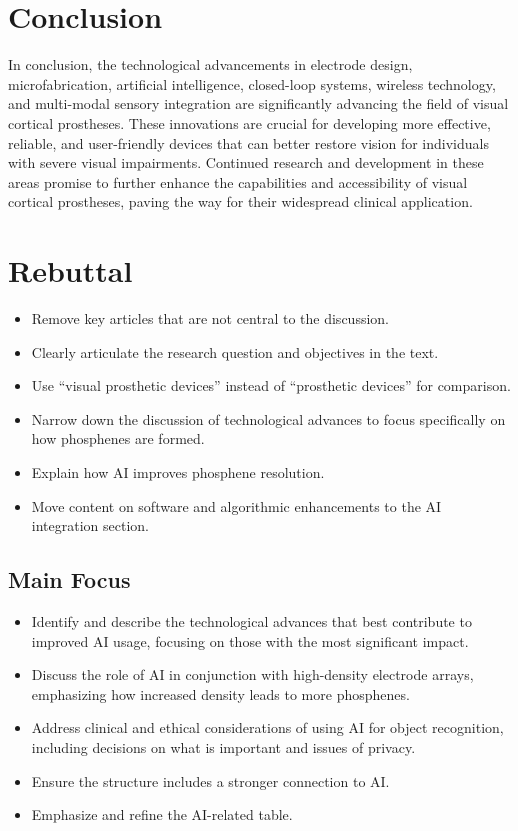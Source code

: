 \documentclass[twocolumn,10pt]{article}
\begin{document}
\section*{Conclusion}\label{sec:conclusion}
In conclusion, the technological advancements in electrode design,
microfabrication, artificial intelligence, closed-loop systems, wireless
technology, and multi-modal sensory integration are significantly advancing the
field of visual cortical prostheses. These innovations are crucial for
developing more effective, reliable, and user-friendly devices that can better
restore vision for individuals with severe visual impairments. Continued
research and development in these areas promise to further enhance the
capabilities and accessibility of visual cortical prostheses, paving the way for
their widespread clinical application.

\printbibliography%
\onecolumn
\newpage
\section*{Rebuttal}\label{sec:rebuttal}
\begin{itemize}
      \item Remove key articles that are not central to the discussion.
      \item Clearly articulate the research question and objectives in the text.
      \item Use ``visual prosthetic devices'' instead of ``prosthetic devices'' for comparison.
      \item Narrow down the discussion of technological advances to focus specifically on how phosphenes are formed.
      \item Explain how AI improves phosphene resolution.
      \item Move content on software and algorithmic enhancements to the AI integration section.
\end{itemize}

\subsection*{Main Focus}
\begin{itemize}
      \item Identify and describe the technological advances that best contribute to improved AI usage, focusing on those with the most significant impact.
      \item Discuss the role of AI in conjunction with high-density electrode arrays, emphasizing how increased density leads to more phosphenes.
      \item Address clinical and ethical considerations of using AI for object recognition, including decisions on what is important and issues of privacy.
      \item Ensure the structure includes a stronger connection to AI.\@
      \item Emphasize and refine the AI-related table.
\end{itemize}
\end{document}
